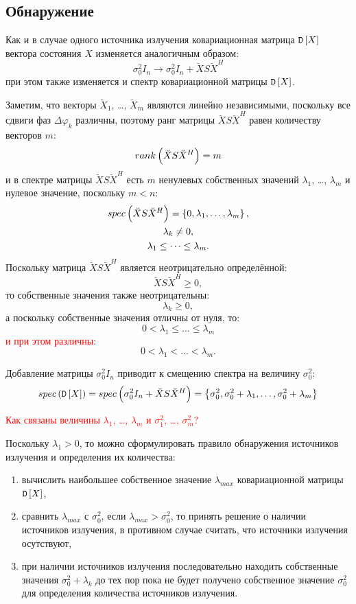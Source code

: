 \subsection{Обнаружение}

Как и в случае одного источника излучения ковариационная матрица $\mathtt{D} \left [ X \right ]$ вектора состояния $X$ изменяется аналогичным образом:
\[
    \sigma_0^2 I_n \rightarrow \sigma_0^2 I_n + \breve{X} S \breve{X}^H
\]
при этом также изменяется и спектр ковариационной матрицы $\mathtt{D} \left [ X \right ]$.

Заметим, что векторы $\breve{X}_1$, \dots, $\breve{X}_m$ являются линейно независимыми, поскольку все сдвиги фаз $\Delta \varphi_k$ различны, поэтому ранг матрицы
$\breve{X} S \breve{X}^H$ равен количеству векторов $m$:
\[
    rank \left ( \breve{X} S \breve{X}^H \right ) = m
\]
и в спектре матрицы $\breve{X} S \breve{X}^H$ есть $m$ ненулевых собственных значений $\lambda_1$, \dots, $\lambda_m$ и нулевое значение, поскольку
$m < n$:
\begin{gather*}
    spec \left ( \breve{X} S \breve{X}^H \right ) = \left \{ 0, \lambda_1, \dots, \lambda_m \right \}, \\
    \lambda_k \neq 0, \\
    \lambda_1 \le \dots \le \lambda_m .
\end{gather*}
Поскольку матрица $\breve{X} S \breve{X}^H$ является неотрицательно определённой:
\[
    \breve{X} S \breve{X}^H \ge 0 ,
\]
то собственные значения также неотрицательны:
\[
    \lambda_k \ge 0,
\]
а поскольку собственные значения отличны от нуля, то:
\[
    0 < \lambda_1 \le \dots \le \lambda_m
\]
\textcolor{red}{и при этом различны}:
\[
    0 < \lambda_1 < \dots < \lambda_m .
\]

Добавление матрицы $\sigma_0^2 I_n$ приводит к смещению спектра на величину $\sigma_0^2$:
\[
    spec \left ( \mathtt{D} \left [ X \right ] \right )
    = spec \left ( \sigma_0^2 I_n + \breve{X} S \breve{X}^H \right )
    = \left \{ \sigma_0^2, \sigma_0^2 + \lambda_1, \dots, \sigma_0^2 + \lambda_m \right \}
\]

\textcolor{red}{Как связаны величины $\lambda_1$, \dots, $\lambda_m$ и $\sigma_1^2$, \dots, $\sigma_m^2$?}

Поскольку $\lambda_1 > 0$, то можно сформулировать правило обнаружения источников излучения и определения их количества:
\begin{enumerate}
    \item вычислить наибольшее собственное значение $\lambda_{max}$ ковариационной матрицы $\mathtt{D} \left [ X \right ]$,
    \item сравнить $\lambda_{max}$ с $\sigma_0^2$, если $\lambda_{max} > \sigma_0^2$, то принять решение о наличии источников излучения, в противном случае
    считать, что источники излучения осутствуют,
    \item при наличии источников излучения последовательно находить собственные значения $\sigma_0^2 + \lambda_k$ до тех пор пока не будет получено собственное
    значение $\sigma_0^2$ для определения количества источников излучения.
\end{enumerate}

